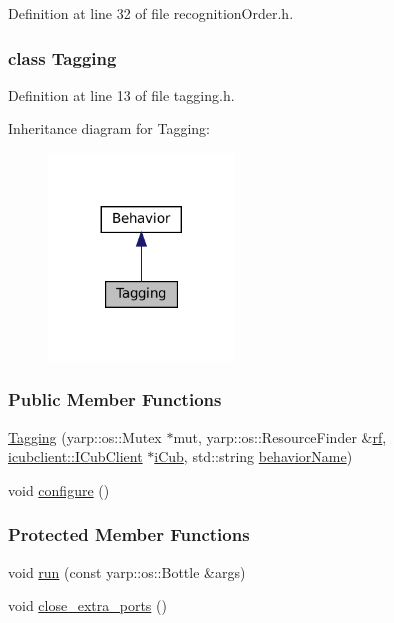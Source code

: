 Definition at line 32 of file recognition\+Order.\+h.

\label{classTagging}
\subsubsection{class Tagging}


Definition at line 13 of file tagging.\+h.



Inheritance diagram for Tagging\+:
\nopagebreak
\begin{figure}[H]
\begin{center}
\leavevmode
\includegraphics[width=140pt]{classTagging__inherit__graph}
\end{center}
\end{figure}
\subsubsection*{Public Member Functions}
\begin{DoxyCompactItemize}
\item 
\hyperlink{group__behaviorManager_a2441c0398c83ebf013147225930acf1e}{Tagging} (yarp\+::os\+::\+Mutex $\ast$mut, yarp\+::os\+::\+Resource\+Finder \&\hyperlink{group__behaviorManager_a789254580a094846e91a9892fa2bc4cd}{rf}, \hyperlink{group__icubclient__clients_classicubclient_1_1ICubClient}{icubclient\+::\+I\+Cub\+Client} $\ast$\hyperlink{group__behaviorManager_a5ab3f49bb3a40d79fe2b4aeb76e12196}{i\+Cub}, std\+::string \hyperlink{group__behaviorManager_aad9d5bf2f1f1e9c6902a4f40b03c4e67}{behavior\+Name})
\item 
void \hyperlink{group__behaviorManager_a6a67413f90a70012ffc2e67074728c0a}{configure} ()
\end{DoxyCompactItemize}
\subsubsection*{Protected Member Functions}
\begin{DoxyCompactItemize}
\item 
void \hyperlink{group__behaviorManager_a8427d7f479b580bbf54030015b506374}{run} (const yarp\+::os\+::\+Bottle \&args)
\item 
void \hyperlink{group__behaviorManager_a2a90e7eda70017f01de96080c05b316c}{close\+\_\+extra\+\_\+ports} ()
\end{DoxyCompactItemize}
